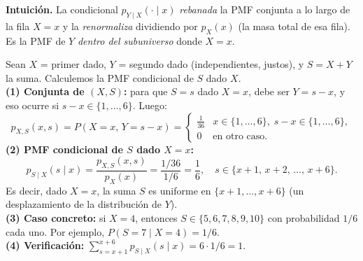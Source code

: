 \documentclass[10pt,a4paper]{article}
\numberwithin{equation}{section}
\newcounter{excount}[section]
\renewcommand{\theexcount}{\thesection.\arabic{excount}}
\newenvironment{ejemplo}[1]{%
  \refstepcounter{excount}%
  \begin{tcolorbox}[exbox, title={Ejemplo \theexcount\ \textperiodcentered\ #1}]%
}{\end{tcolorbox}}
\newenvironment{nota}{\begin{tcolorbox}[notebox]}{\end{tcolorbox}}
\begin{document}
\begin{nota}
  \textbf{Intuici\'on.} La condicional $p_{Y\mid X}(\cdot \mid x)$ \emph{rebanada} la PMF
  conjunta a lo largo de la fila $X = x$ y la \emph{renormaliza} dividiendo por $p_X(x)$
  (la masa total de esa fila). Es la PMF de $Y$ \emph{dentro del subuniverso} donde $X = x$.
\end{nota}

\begin{ejemplo}{Suma de dos dados condicionada al primero}
  Sean $X$ = primer dado, $Y$ = segundo dado (independientes, justos), y $S = X + Y$ la suma.
  Calculemos la PMF condicional de $S$ dado $X$.
  \\[3pt]
  \textbf{(1) Conjunta de $(X, S)$:} para que $S = s$ dado $X = x$, debe ser $Y = s - x$, y eso
  ocurre si $s - x \in \{1, \ldots, 6\}$. Luego:
  \[
    p_{X,S}(x, s) = P(X=x,\, Y=s-x) = \begin{cases}
      \tfrac{1}{36} & x \in \{1,\ldots,6\},\; s-x \in \{1,\ldots,6\}, \\
      0             & \text{en otro caso}.
    \end{cases}
  \]
  \textbf{(2) PMF condicional de $S$ dado $X = x$:}
  \[
    p_{S\mid X}(s \mid x) = \frac{p_{X,S}(x, s)}{p_X(x)} = \frac{1/36}{1/6} = \frac{1}{6},
    \quad s \in \{x+1,\, x+2,\, \ldots,\, x+6\}.
  \]
  Es decir, dado $X = x$, la suma $S$ es uniforme en $\{x+1, \ldots, x+6\}$ (un desplazamiento
  de la distribuci\'on de $Y$).
  \\[3pt]
  \textbf{(3) Caso concreto:} si $X = 4$, entonces $S \in \{5, 6, 7, 8, 9, 10\}$ con probabilidad
  $1/6$ cada uno. Por ejemplo, $P(S = 7 \mid X = 4) = 1/6$.
  \\[3pt]
  \textbf{(4) Verificaci\'on:} $\sum_{s=x+1}^{x+6} p_{S\mid X}(s \mid x) = 6 \cdot 1/6 = 1$. \;\checkmark
\end{ejemplo}
\end{document}
